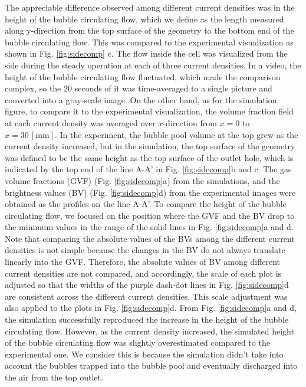 \documentclass[3p, twocolumn, 10pt]{elsarticle}
\begin{document}
The appreciable difference observed among different current densities was in the height of the bubble circulating flow, which we define as the length measured along y-direction from the top surface of the geometry to the bottom end of the bubble circulating flow.
This was compared to the experimental visualization as shown in Fig. \ref{fig:sidecomp} c.
The flow inside the cell was visualized from the side during the steady operation at each of three current densities.
In a video, the height of the bubble circulating flow fluctuated, which made the comparison complex, so the $20$ seconds of it was time-averaged to a single picture and converted into a gray-scale image.
On the other hand, as for the simulation figure, to compare it to the experimental visualization, the volume fraction field at each current density was averaged over $x$-direction from $x=0$ to $x=30\,\mathrm{[mm]}$.
In the experiment, the bubble pool volume at the top grew as the current density increased, but in the simulation, the top surface of the geometry was defined to be the same height as the top surface of the outlet hole, which is indicated by the top end of the line A-A' in Fig. \ref{fig:sidecomp}b and c.
The gas volume fractions (GVF) (Fig. \ref{fig:sidecomp}a) from the simulations, and the brightness values (BV) (Fig. \ref{fig:sidecomp}d) from the experimental images were obtained as the profiles on the line A-A'.
To compare the height of the bubble circulating flow, we focused on the position where the GVF and the BV drop to the minimum values in the range of the solid lines in Fig. \ref{fig:sidecomp}a and d.
Note that comparing the absolute values of the BVs among the different current densities is not simple because the changes in the BV do not always translate linearly into the GVF.
Therefore, the absolute values of BV among different current densities are not compared, and accordingly, the scale of each plot is adjusted so that the widths of the purple dash-dot lines in Fig. \ref{fig:sidecomp}d are consistent across the different current densities.
This scale adjustment was also applied to the plots in Fig. \ref{fig:sidecomp}d.
From Fig. \ref{fig:sidecomp}a and d, the simulation successfully reproduced the increase in the height of the bubble circulating flow.
However, as the current density increased, the simulated height of the bubble circulating flow was slightly overestimated compared to the experimental one. We consider this is because the simulation didn't take into account the bubbles trapped into the bubble pool and eventually discharged into the air from the top outlet.
\end{document}
